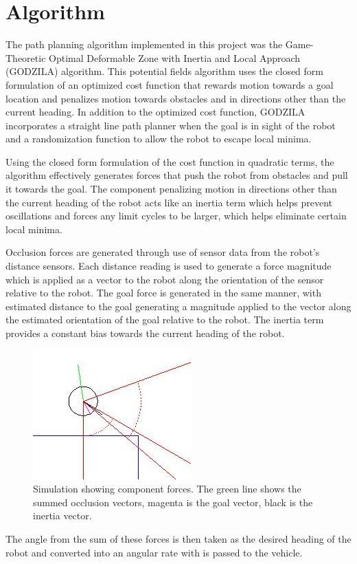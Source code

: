 \chapter{Algorithm}

The path planning algorithm implemented in this project was the Game-Theoretic Optimal Deformable Zone with Inertia and Local Approach (GODZILA) algorithm. This potential fields algorithm uses the closed form formulation of an optimized cost function that rewards motion towards a goal location and penalizes motion towards obstacles and in directions other than the current heading. In addition to the optimized cost function, GODZILA incorporates a straight line path planner when the goal is in sight of the robot and a randomization function to allow the robot to escape local minima.

Using the closed form formulation of the cost function in quadratic terms, the algorithm effectively generates forces that push the robot from obstacles and pull it towards the goal. The component penalizing motion in directions other than the current heading of the robot acts like an inertia term which helps prevent oscillations and forces any limit cycles to be larger, which helps eliminate certain local minima.

Occlusion forces are generated through use of sensor data from the robot's distance sensors. Each distance reading is used to generate a force magnitude which is applied as a vector to the robot along the orientation of the sensor relative to the robot.
The goal force is generated in the same manner, with estimated distance to the goal generating a magnitude applied to the vector along the estimated orientation of the goal relative to the robot. The inertia term provides a constant bias towards the current heading of the robot. 

\begin{figure}[h]
	\centering
	\includegraphics{force_sim1.jpg}
	\caption[Simulation showing component forces.]
	{Simulation showing component forces. The green line shows the summed occlusion vectors, magenta is the goal vector,
	 black is the inertia vector.}
	\label{fig:forceSim1}
\end{figure}

The angle from the sum of these forces is then taken as the desired heading of the robot and converted into an angular rate with is passed to the vehicle.
